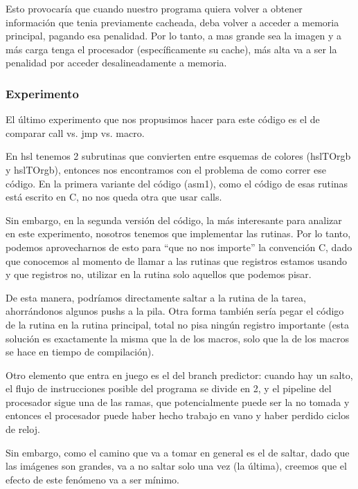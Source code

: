 Esto provocaría que cuando nuestro programa quiera volver a obtener información que tenia previamente cacheada, deba volver a acceder a memoria principal, pagando esa penalidad. Por lo tanto, a mas grande sea la imagen y a más carga tenga el procesador (específicamente su cache), más alta va a ser la penalidad por acceder desalineadamente a memoria.

\subsubsection*{Experimento}
El último experimento que nos propusimos hacer para este código es el de comparar call vs. jmp vs. macro.

En hsl tenemos 2 subrutinas que convierten entre esquemas de colores (hslTOrgb y hslTOrgb), entonces nos encontramos con el problema de como correr ese código. En la primera variante del código (asm1), como el código de esas rutinas está escrito en C, no nos queda otra que usar calls.

Sin embargo, en la segunda versión del código, la más interesante para analizar en este experimento, nosotros tenemos que implementar las rutinas. Por lo tanto, podemos aprovecharnos de esto para ``que no nos importe'' la convención C, dado que conocemos al momento de llamar a las rutinas que registros estamos usando y que registros no, utilizar en la rutina solo aquellos que podemos pisar.

De esta manera, podríamos directamente saltar a la rutina de la tarea, ahorrándonos algunos pushs a la pila. Otra forma también sería pegar el código de la rutina en la rutina principal, total no pisa ningún registro importante (esta solución es exactamente la misma que la de los macros, solo que la de los macros se hace en tiempo de compilación).

Otro elemento que entra en juego es el del branch predictor: cuando hay un salto, el flujo de instrucciones posible del programa se divide en 2, y el pipeline del procesador sigue una de las ramas, que potencialmente puede ser la no tomada y entonces el procesador puede haber hecho trabajo en vano y haber perdido ciclos de reloj.

Sin embargo, como el camino que va a tomar en general es el de saltar, dado que las imágenes son grandes, va a no saltar solo una vez (la última), creemos que el efecto de este fenómeno va a ser mínimo.

